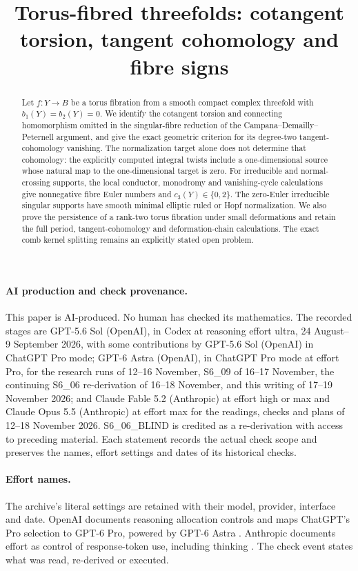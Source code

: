 

\title{Torus-fibred threefolds: cotangent torsion, tangent cohomology and fibre signs}\maketitle
\begin{abstract}
Let $f:Y\to B$ be a torus fibration from a smooth compact complex
threefold with $b_1(Y)=b_2(Y)=0$. We identify the cotangent torsion
and connecting homomorphism omitted in the singular-fibre reduction
of the Campana--Demailly--Peternell argument, and give the exact
geometric criterion for its degree-two tangent-cohomology vanishing.
The normalization target alone does not determine that cohomology:
the explicitly computed integral twists include a one-dimensional
source whose natural map to the one-dimensional target is zero.
For irreducible and normal-crossing supports, the local conductor,
monodromy and vanishing-cycle calculations give nonnegative fibre
Euler numbers and $c_3(Y)\in\{0,2\}$. The zero-Euler irreducible
singular supports have smooth minimal elliptic ruled or Hopf
normalization. We also prove the persistence of a rank-two torus
fibration under small deformations and retain the full period,
tangent-cohomology and deformation-chain calculations. The exact
comb kernel splitting remains an explicitly stated open problem.
\end{abstract}
\paragraph{AI production and check provenance.}
This paper is AI-produced. No human has checked its mathematics.
The recorded stages are GPT-5.6 Sol (OpenAI), in Codex at reasoning
effort ultra, 24 August--9 September 2026, with some contributions by
GPT-5.6 Sol (OpenAI) in ChatGPT Pro mode; GPT-6 Astra (OpenAI), in
ChatGPT Pro mode at effort Pro, for the research runs of 12--16
November, S6\_09 of 16--17 November, the continuing S6\_06 re-derivation
of 16--18 November, and this writing of 17--19 November 2026;
and Claude Fable 5.2 (Anthropic)
at effort high or max and Claude Opus 5.5 (Anthropic) at effort max
for the readings, checks and plans of 12--18 November 2026.
S6\_06\_BLIND is credited as a re-derivation with access to preceding
material. Each statement records the actual check scope and preserves
the names, effort settings and dates of its historical checks.

\paragraph{Effort names.}
The archive's literal settings are retained with their model, provider,
interface and date. OpenAI documents reasoning allocation controls
\cite[sections ``Reasoning effort'' and ``Reasoning mode'']{OpenAIReasoning2026}
and maps ChatGPT's Pro selection to GPT-6 Pro, powered by GPT-6 Astra
\cite[section ``Choose a thinking level'']{OpenAIChatGPTPro2026}.
Anthropic documents effort as control of response-token use, including
thinking \cite[sections ``How effort works'' and ``Effort levels'']{AnthropicEffort2026}.
The check event states what was read, re-derived or executed.

